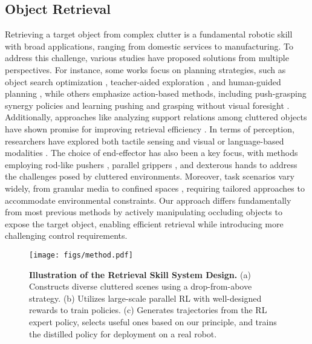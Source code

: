 \subsection{Object Retrieval}
Retrieving a target object from complex clutter is a fundamental robotic skill with broad applications, ranging from domestic services to manufacturing. To address this challenge, various studies have proposed solutions from multiple perspectives. For instance, some works focus on planning strategies, such as object search optimization \cite{8793494}, teacher-aided exploration \cite{9341545}, and human-guided planning \cite{9196689}, while others emphasize action-based methods, including push-grasping synergy policies \cite{9465702} and learning pushing and grasping without visual foresight \cite{8794143}. Additionally, approaches like analyzing support relations among cluttered objects have shown promise for improving retrieval efficiency \cite{li2024broadcasting}. In terms of perception, researchers have explored both tactile sensing \cite{xu2024tactile, 10611541} and visual or language-based modalities \cite{lemke2024spotcompose, pmlr-v205-tang23a}. The choice of end-effector has also been a key focus, with methods employing rod-like pushers \cite{10161041}, parallel grippers \cite{9636230, pmlr-v205-tang23a, 10611541, 9812132}, and dexterous hands \cite{pmlr-v229-chen23e} to address the challenges posed by cluttered environments. Moreover, task scenarios vary widely, from granular media \cite{xu2024tactile} to confined spaces \cite{10611541}, requiring tailored approaches to accommodate environmental constraints. Our approach differs fundamentally from most previous methods by actively manipulating occluding objects to expose the target object, enabling efficient retrieval while introducing more challenging control requirements.

\begin{figure*}
    \centering
    \texttt{[image: figs/method.pdf]}
    \caption{\textbf{Illustration of the Retrieval Skill System Design.} (a) Constructs diverse cluttered scenes using a drop-from-above strategy. (b) Utilizes large-scale parallel RL with well-designed rewards to train policies. (c) Generates trajectories from the RL expert policy, selects useful ones based on our principle, and trains the distilled policy for deployment on a real robot.}
    \label{fig:method}
\end{figure*}

